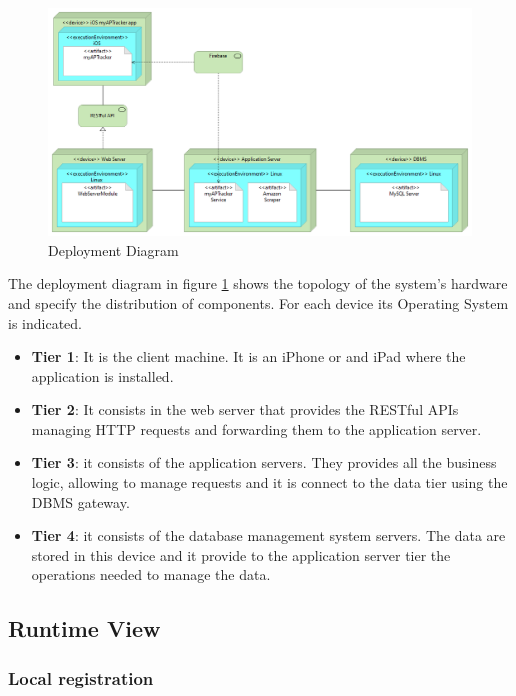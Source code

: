 \begin{figure}[h!]
        \centering
        \includegraphics[scale=0.40]{images/deployment_view.png}
        \caption{Deployment Diagram}
        \label{fig:deployement_diagram}
\end{figure}
\FloatBarrier

The deployment diagram in figure \ref{fig:deployement_diagram} shows the topology of the system's hardware and specify the distribution of components. For each device its Operating System is indicated.
\begin{itemize}
    \item \textbf{Tier 1}: It is the client machine. It is an iPhone or and iPad where the application is installed.
    \item \textbf{Tier 2}: It consists in the web server that provides the RESTful APIs managing HTTP requests and forwarding them to the application server.
    \item \textbf{Tier 3}: it consists of the application servers. They provides all the business logic, allowing to manage requests and it is connect to the data tier using the DBMS gateway.
    \item \textbf{Tier 4}: it consists of the database management system servers. The data are stored in this device and it provide to the application server tier the operations needed to manage the data.
\end{itemize}
\newpage
\subsection{Runtime View}
\subsubsection{Local registration}

